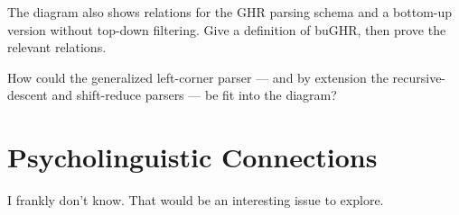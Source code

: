 \begin{exercise}
    The diagram also shows relations for the GHR parsing schema and a bottom-up version without top-down filtering.
    Give a definition of buGHR, then prove the relevant relations.
\end{exercise}

\begin{exercise}
    How could the generalized left-corner parser --- and by extension the recursive-descent and shift-reduce parsers --- be fit into the diagram?
\end{exercise}

\section{Psycholinguistic Connections}

I frankly don't know.
That would be an interesting issue to explore.

